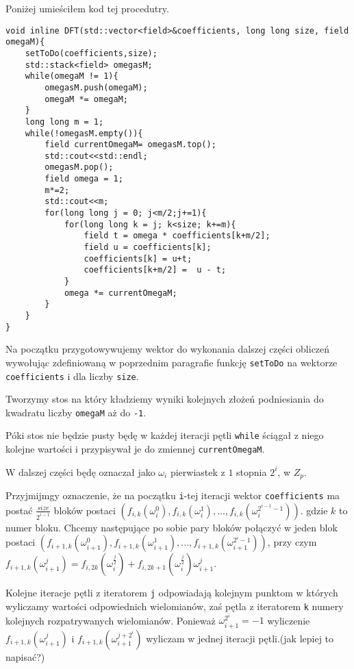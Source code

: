 \documentclass{article}
\begin{document}
Poniżej umieściłem kod tej procedutry.

\begin{lstlisting}
void inline DFT(std::vector<field>&coefficients, long long size, field omegaM){
    setToDo(coefficients,size);
    std::stack<field> omegasM;
    while(omegaM != 1){
        omegasM.push(omegaM);
        omegaM *= omegaM;
    }
    long long m = 1;
    while(!omegasM.empty()){   
        field currentOmegaM= omegasM.top();
        std::cout<<std::endl;
        omegasM.pop();
        field omega = 1;
        m*=2;
        std::cout<<m;
        for(long long j = 0; j<m/2;j+=1){
            for(long long k = j; k<size; k+=m){
                field t = omega * coefficients[k+m/2];
                field u = coefficients[k];
                coefficients[k] = u+t;
                coefficients[k+m/2] =  u - t;
            }
            omega *= currentOmegaM;
        }
    }
}
\end{lstlisting}




Na początku przygotowywujemy wektor do wykonania dalszej części obliczeń wywołując zdefiniowaną w poprzednim paragrafie funkcję \texttt{setToDo} na wektorze 
\texttt{coefficients} i dla liczby \texttt{size}. 

Tworzymy stos na który kładziemy wyniki kolejnych złożeń podniesiania do kwadratu liczby \texttt{omegaM} aż do \texttt{-1}.

Póki stos nie będzie pusty będę w każdej iteracji pętli \texttt{while} ściągał z niego kolejne wartości i przypisywał je do zmiennej \texttt{currentOmegaM}.

W dalszej części będę oznaczał jako $\omega_i$ pierwiastek z $1$ stopnia $2^i$, w $Z_p$.

Przyjmijmgy oznaczenie, że na początku \texttt{i}-tej iteracji wektor \texttt{coefficients} ma postać $\frac{size}{2^{i-1}}$ bloków postaci
$(f_{i,k}(\omega_i^0),f_{i,k}(\omega_i^1),...,f_{i,k}(\omega^{2^{i-1}-1}_i))$. gdzie $k$ to numer bloku. Chcemy
następujące po sobie pary bloków połączyć w jeden blok postaci $(f_{i+1,k}(\omega_{i+1}^0),f_{i+1,k}(\omega_{i+1}^1),...,
f_{i+1,k}(\omega^{2^{i}-1}_{i+1}))$, przy czym 
$f_{i+1,k}(\omega_{i+1}^j) = f_{i,2k}(\omega_{i}^\frac{j}{2})+f_{i,2k+1}(\omega_{i}^{\frac{j}{2}})\omega_{i+1}^j$. 

Kolejne iteracje pętli z iteratorem \texttt{j} odpowiadają kolejnym punktom w których wyliczamy wartości odpowiednich wielomianów, zaś pętla z iteratorem \texttt{k}
numery kolejnych rozpatrywanych wielomianów. Ponieważ $\omega_{i+1}^{2^i}=-1$ wyliczenie $f_{i+1,k}(\omega_{i+1}^{j})$ i $f_{i+1,k}(\omega_{i+1}^{j+2^i})$ 
wyliczam w jednej iteracji pętli.(jak lepiej to napisać?)
\end{document}
